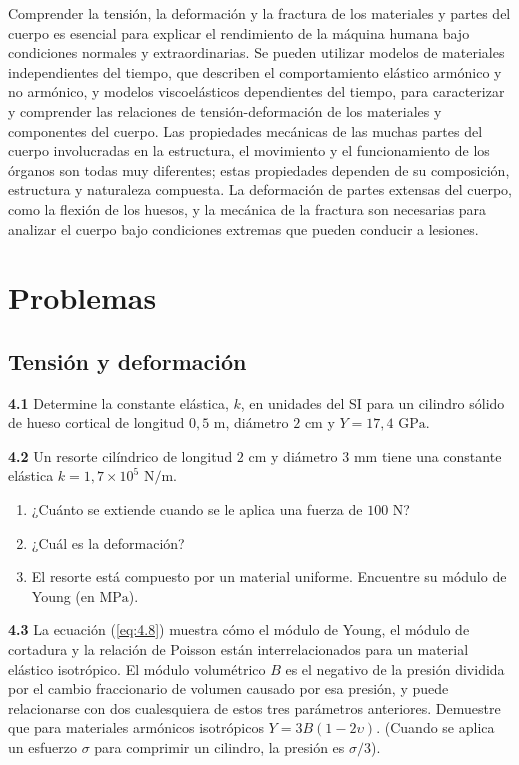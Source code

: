 \documentclass[12pt]{book}
\begin{document}
Comprender la tensión, la deformación y la fractura de los materiales y partes del cuerpo es esencial para explicar el rendimiento de la máquina humana bajo condiciones normales y extraordinarias. Se pueden utilizar modelos de materiales independientes del tiempo, que describen el comportamiento elástico armónico y no armónico, y modelos viscoelásticos dependientes del tiempo, para caracterizar y comprender las relaciones de tensión-deformación de los materiales y componentes del cuerpo. Las propiedades mecánicas de las muchas partes del cuerpo involucradas en la estructura, el movimiento y el funcionamiento de los órganos son todas muy diferentes; estas propiedades dependen de su composición, estructura y naturaleza compuesta. La deformación de partes extensas del cuerpo, como la flexión de los huesos, y la mecánica de la fractura son necesarias para analizar el cuerpo bajo condiciones extremas que pueden conducir a lesiones.

\section*{Problemas}

\subsection*{Tensión y deformación}

\textbf{4.1} Determine la constante elástica, $k$, en unidades del SI para un cilindro sólido de hueso cortical de longitud $0,5\text{ m}$, diámetro $2\text{ cm}$ y $Y = 17,4\text{ GPa}$.

\textbf{4.2} Un resorte cilíndrico de longitud $2\text{ cm}$ y diámetro $3\text{ mm}$ tiene una constante elástica $k = 1,7 \times 10^5\text{ N/m}$.
\begin{enumerate}
  \item[(a)] ¿Cuánto se extiende cuando se le aplica una fuerza de $100\text{ N}$?
  \item[(b)] ¿Cuál es la deformación?
  \item[(c)] El resorte está compuesto por un material uniforme. Encuentre su módulo de Young (en $\text{MPa}$).
\end{enumerate}

\textbf{4.3} La ecuación (\ref{eq:4.8}) muestra cómo el módulo de Young, el módulo de cortadura y la relación de Poisson están interrelacionados para un material elástico isotrópico. El módulo volumétrico $B$ es el negativo de la presión dividida por el cambio fraccionario de volumen causado por esa presión, y puede relacionarse con dos cualesquiera de estos tres parámetros anteriores. Demuestre que para materiales armónicos isotrópicos $Y = 3B(1 - 2\upsilon)$. (Cuando se aplica un esfuerzo $\sigma$ para comprimir un cilindro, la presión es $\sigma/3$).
\end{document}
